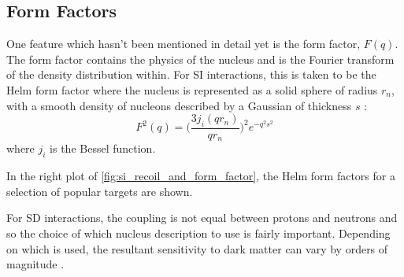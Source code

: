 \subsection{Form Factors}
\label{sec:form_factors}
\par
One feature which hasn't been mentioned in detail yet is the form factor, $F(q)$.
The form factor contains the physics of the nucleus and is the Fourier transform of the density distribution within.
For SI interactions, this is taken to be the Helm form factor where the nucleus is represented as a solid sphere of radius $r_n$, with a smooth density of nucleons described by a Gaussian of thickness $s$ \cite{helm_form_factor_ref}:
\begin{equation}
    F^2(q) = \bigg( \frac{3j_i(qr_n)}{qr_n} \bigg)^2 e^{-q^2 s^2}
\end{equation}
where $j_i$ is the Bessel function.
\par
In the right plot of \autoref{fig:si_recoil_and_form_factor}, the Helm form factors for a selection of popular targets are shown.

\par
For SD interactions, the coupling is not equal between protons and neutrons and so the choice of which nucleus description to use is fairly important.
Depending on which is used, the resultant sensitivity to dark matter can vary by orders of magnitude \cite{wimp_nuclear_model_ref,wimp_sd_form_factor_ref}.
